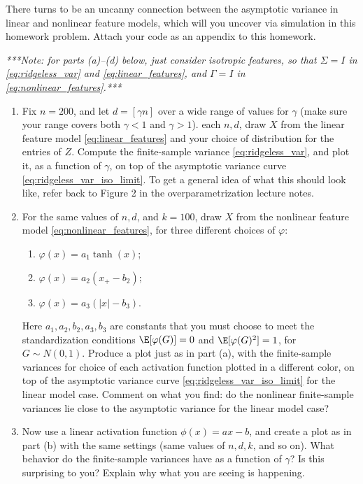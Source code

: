 \documentclass{article}
\begin{document}
There turns to be an uncanny connection between the asymptotic variance in
linear and nonlinear feature models, which will you uncover via simulation in
this homework problem. Attach your code as an appendix to this homework.  

\emph{***Note: for parts (a)--(d) below, just consider isotropic features, so
  that $\Sigma = I$ in \eqref{eq:ridgeless_var} and \eqref{eq:linear_features},
  and $\Gamma = I$ in \eqref{eq:nonlinear_features}.***}

\begin{enumerate}[label=(\alph*)]
\item Fix $n=200$, and let $d=[\gamma n]$ over a wide range of values for
  $\gamma$ (make sure your range covers both $\gamma<1$ and $\gamma>1$). 
  each $n,d$, draw $X$ from the linear feature model \eqref{eq:linear_features}
  and your choice of distribution for the entries of $Z$. Compute the
  finite-sample variance \eqref{eq:ridgeless_var}, and plot it, as a function of
  $\gamma$, on top of the asymptotic variance curve
  \eqref{eq:ridgeless_var_iso_limit}. To get a general idea of what this should
  look like, refer back to Figure 2 in the overparametrization lecture notes.      
  \marginpar{\small [3 pts]}

\item For the same values of $n,d$, and $k=100$, draw $X$ from the nonlinear
  feature model \eqref{eq:nonlinear_features}, for three different choices of
  $\varphi$:   
  \begin{enumerate}[label=\roman*.]
  \item $\varphi(x) = a_1\tanh(x)$;
  \item $\varphi(x) = a_2(x_+-b_2)$;
  \item $\varphi(x) = a_3(|x|-b_3)$.
  \end{enumerate}
  Here $a_1,a_2,b_2,a_3,b_3$ are constants that you must choose to meet the 
  standardization conditions $\E[\varphi(G)]=0$ and $\E[\varphi(G)^2]=1$, for 
  $G \sim N(0,1)$. Produce a plot just as in part (a), with the finite-sample
  variances for choice of each activation function plotted in a different color,
  on top of the asymptotic variance curve \eqref{eq:ridgeless_var_iso_limit} for  
  the linear model case. Comment on what you find: do the nonlinear
  finite-sample variances lie close to the asymptotic variance for the linear
  model case?  
  \marginpar{\small [9 pts]}

\item Now use a linear activation function $\phi(x) = ax-b$, and create a plot
  as in part (b) with the same settings (same values of $n,d,k$, and so
  on). What behavior do the finite-sample variances have as a function of 
  $\gamma$? Is this surprising to you? Explain why what you are seeing is
  happening. 
 \marginpar{\small [3 pts]}


\end{enumerate}
\end{document}

